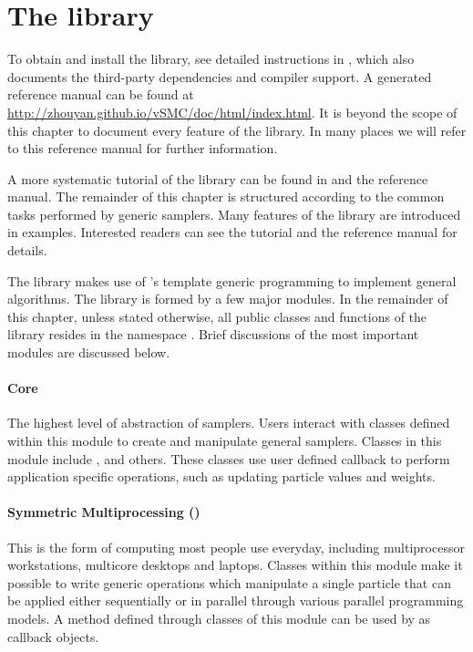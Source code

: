\section{The \protect\vsmc library}
\label{sec:The vSMC library}

To obtain and install the library, see detailed instructions in
\cite{vsmcjss}, which also documents the third-party dependencies and compiler
support. A \doxygen \cite{doxygen} generated reference manual can be found at
\url{http://zhouyan.github.io/vSMC/doc/html/index.html}. It is beyond the
scope of this chapter to document every feature of the \vsmc library. In many
places we will refer to this reference manual for further information.

A more systematic tutorial of the library can be found in \cite{vsmcjss} and
the reference manual. The remainder of this chapter is structured according to
the common tasks performed by generic \smc samplers. Many features of the
library are introduced in examples. Interested readers can see the tutorial
\cite{vsmcjss} and the reference manual for details.

The \vsmc library makes use of \cpp's template generic programming to
implement general \smc algorithms. The library is formed by a few major
modules. In the remainder of this chapter, unless stated otherwise, all public
classes and functions of the library resides in the namespace
. Brief discussions of the most important modules are
discussed below.

\paragraph{Core}

The highest level of abstraction of \smc samplers. Users interact with classes
defined within this module to create and manipulate general \smc samplers.
Classes in this module include ,  and
others. These classes use user defined callback to perform application
specific operations, such as updating particle values and weights.

\paragraph{Symmetric Multiprocessing (\smp)}

This is the form of computing most people use everyday, including
multiprocessor workstations, multicore desktops and laptops. Classes within
this module make it possible to write generic operations which manipulate a
single particle that can be applied either sequentially or in parallel through
various parallel programming models. A method defined through classes of this
module can be used by  as callback objects.


